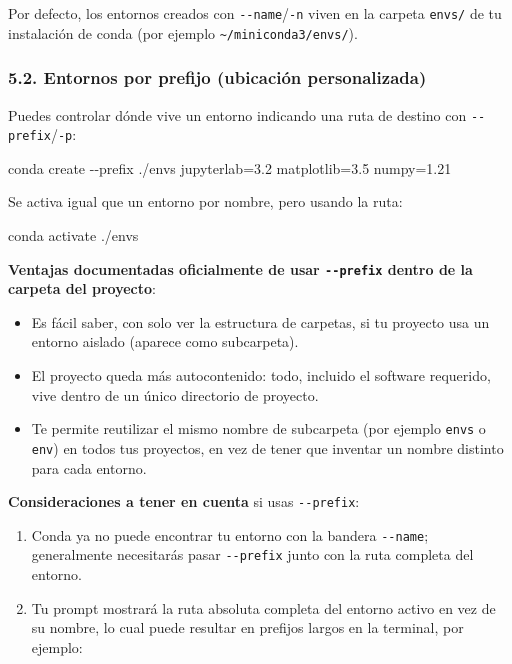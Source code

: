 \documentclass[
  doc,
  floatsintext,
  longtable,
  a4paper,
  nolmodern,
  notxfonts,
  notimes,
  12pt,
  colorlinks=true,linkcolor=blue,citecolor=blue,urlcolor=blue]{apa7}
\newenvironment{Shaded}{\begin{snugshade}}{\end{snugshade}}
\newcommand{\AttributeTok}[1]{\textcolor[rgb]{0.40,0.45,0.13}{#1}}
\newcommand{\ExtensionTok}[1]{\textcolor[rgb]{0.00,0.23,0.31}{#1}}
\newcommand{\NormalTok}[1]{\textcolor[rgb]{0.00,0.23,0.31}{#1}}
\providecommand{\tightlist}{%
  \setlength{\itemsep}{0pt}\setlength{\parskip}{0pt}}
\begin{document}
Por defecto, los entornos creados con \texttt{-\/-name}/\texttt{-n}
viven en la carpeta \texttt{envs/} de tu instalación de conda (por
ejemplo \texttt{\textasciitilde{}/miniconda3/envs/}).

\subsubsection{5.2. Entornos por prefijo (ubicación
personalizada)}\label{entornos-por-prefijo-ubicaciuxf3n-personalizada}

Puedes controlar dónde vive un entorno indicando una ruta de destino con
\texttt{-\/-prefix}/\texttt{-p}:

\begin{Shaded}
\begin{Highlighting}[]
\ExtensionTok{conda}\NormalTok{ create }\AttributeTok{{-}{-}prefix}\NormalTok{ ./envs jupyterlab=3.2 matplotlib=3.5 numpy=1.21}
\end{Highlighting}
\end{Shaded}

Se activa igual que un entorno por nombre, pero usando la ruta:

\begin{Shaded}
\begin{Highlighting}[]
\ExtensionTok{conda}\NormalTok{ activate ./envs}
\end{Highlighting}
\end{Shaded}

\textbf{Ventajas documentadas oficialmente de usar \texttt{-\/-prefix}
dentro de la carpeta del proyecto}:

\begin{itemize}
\tightlist
\item
  Es fácil saber, con solo ver la estructura de carpetas, si tu proyecto
  usa un entorno aislado (aparece como subcarpeta).
\item
  El proyecto queda más autocontenido: todo, incluido el software
  requerido, vive dentro de un único directorio de proyecto.
\item
  Te permite reutilizar el mismo nombre de subcarpeta (por ejemplo
  \texttt{envs} o \texttt{env}) en todos tus proyectos, en vez de tener
  que inventar un nombre distinto para cada entorno.
\end{itemize}

\textbf{Consideraciones a tener en cuenta} si usas \texttt{-\/-prefix}:

\begin{enumerate}
\def\labelenumi{\arabic{enumi}.}
\tightlist
\item
  Conda ya no puede encontrar tu entorno con la bandera
  \texttt{-\/-name}; generalmente necesitarás pasar \texttt{-\/-prefix}
  junto con la ruta completa del entorno.
\item
  Tu prompt mostrará la ruta absoluta completa del entorno activo en vez
  de su nombre, lo cual puede resultar en prefijos largos en la
  terminal, por ejemplo:
\end{enumerate}
\end{document}
